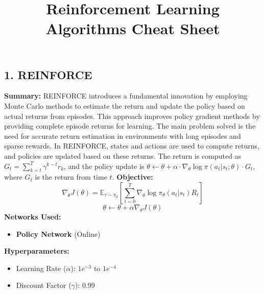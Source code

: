 \documentclass[a4paper,10pt]{article}
\title{\vspace{-4cm}Reinforcement Learning Algorithms Cheat Sheet}
\author{}
\date{}
\begin{document}
\maketitle
\footnotesize
\begin{multicols}{2}

\section*{1. REINFORCE}
\textbf{Summary:} REINFORCE introduces a fundamental innovation by employing Monte Carlo methods to estimate the return and update the policy based on actual returns from episodes. This approach improves policy gradient methods by providing complete episode returns for learning. The main problem solved is the need for accurate return estimation in environments with long episodes and sparse rewards. In REINFORCE, states and actions are used to compute returns, and policies are updated based on these returns. The return is computed as \( G_t = \sum_{k=t}^T \gamma^{k-t} r_k \), and the policy update is \( \theta \leftarrow \theta + \alpha \cdot \nabla_\theta \log \pi(a_t | s_t; \theta) \cdot G_t \), where \( G_t \) is the return from time \( t \).
\textbf{Objective:}
\[
\nabla_\theta J(\theta) = \mathbb{E}_{\tau \sim \pi_\theta} \left[ \sum_{t=0}^{T} \nabla_\theta \log \pi_\theta(a_t | s_t) R_t \right]
\]
\[
\theta \leftarrow \theta + \alpha \nabla_\theta J(\theta)
\]
\textbf{Networks Used:} 
\begin{itemize}
    \item \textbf{Policy Network} (Online)
\end{itemize}
\textbf{Hyperparameters:}
\begin{itemize}
    \item Learning Rate (\(\alpha\)): \(1e^{-3}\) to \(1e^{-4}\)
    \item Discount Factor (\(\gamma\)): 0.99
\end{itemize}


\end{multicols}
\end{document}
